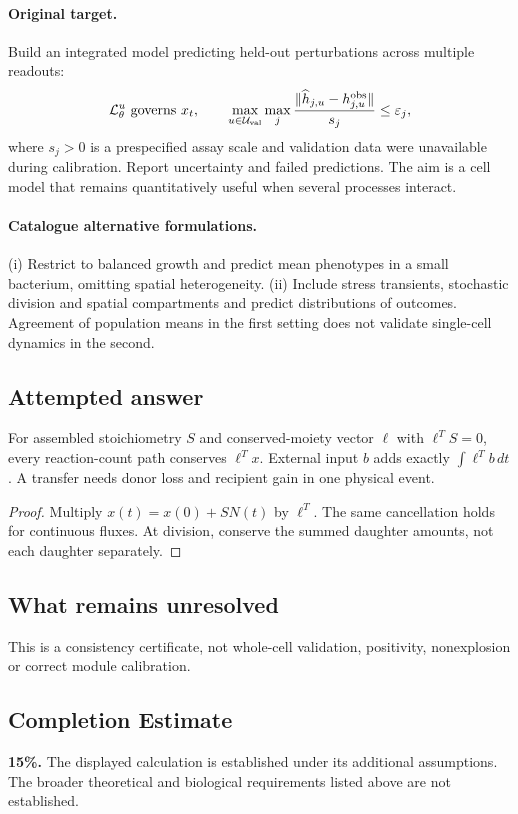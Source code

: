 \documentclass[11pt]{article}
\begin{document}
\paragraph{Original target.}
Build an integrated model predicting held-out perturbations across multiple readouts:
\[
\mathcal L_\theta^u\text{ governs }x_t,
\qquad \max_{u\in\mathcal U_{\rm val}}\max_j
\frac{\|\widehat h_{j,u}-h_{j,u}^{\rm obs}\|}{s_j}\leq\varepsilon_j,
\]
where $s_j>0$ is a prespecified assay scale and validation data were unavailable during calibration. Report uncertainty and failed predictions. The aim is a cell model that remains quantitatively useful when several processes interact.
\paragraph{Catalogue alternative formulations.}
(i) Restrict to balanced growth and predict mean phenotypes in a small bacterium, omitting spatial heterogeneity. (ii) Include stress transients, stochastic division and spatial compartments and predict distributions of outcomes. Agreement of population means in the first setting does not validate single-cell dynamics in the second.
\subsection{Attempted answer}
\begin{proposition}
For assembled stoichiometry $S$ and conserved-moiety vector $\ell$ with $\ell^TS=0$, every reaction-count path conserves $\ell^Tx$. External input $b$ adds exactly $\int\ell^Tb\,dt$. A transfer needs donor loss and recipient gain in one physical event.
\end{proposition}
\begin{proof}
Multiply $x(t)=x(0)+SN(t)$ by $\ell^T$. The same cancellation holds for continuous fluxes. At division, conserve the summed daughter amounts, not each daughter separately.
\end{proof}
\subsection{What remains unresolved}
This is a consistency certificate, not whole-cell validation, positivity, nonexplosion or correct module calibration.
\subsection{Completion Estimate}
\textbf{15\%.} The displayed calculation is established under its additional assumptions. The broader theoretical and biological requirements listed above are not established.
\end{document}
